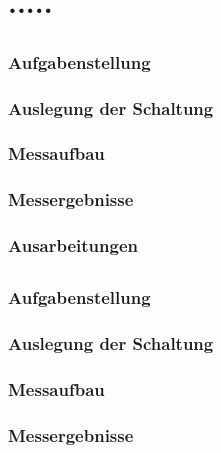 \chapter{.....}
	\section{}
		\subsection{Aufgabenstellung}

		\subsection{Auslegung der Schaltung}

		\subsection{Messaufbau}

		\subsection{Messergebnisse}

		\subsection{Ausarbeitungen}
		
	\section{}
		\subsection{Aufgabenstellung}

		\subsection{Auslegung der Schaltung}

		\subsection{Messaufbau}

		\subsection{Messergebnisse}

